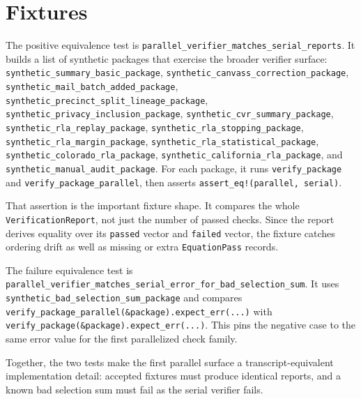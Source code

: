 \section{Fixtures}

The positive equivalence test is
\texttt{parallel\_verifier\_matches\_serial\_reports}. It builds a list of
synthetic packages that exercise the broader verifier surface:
\texttt{synthetic\_summary\_basic\_package},
\texttt{synthetic\_canvass\_correction\_package},
\texttt{synthetic\_mail\_batch\_added\_package},
\texttt{synthetic\_precinct\_split\_lineage\_package},
\texttt{synthetic\_privacy\_inclusion\_package},
\texttt{synthetic\_cvr\_summary\_package},
\texttt{synthetic\_rla\_replay\_package},
\texttt{synthetic\_rla\_stopping\_package},
\texttt{synthetic\_rla\_margin\_package},
\texttt{synthetic\_rla\_statistical\_package},
\texttt{synthetic\_colorado\_rla\_package},
\texttt{synthetic\_california\_rla\_package}, and
\texttt{synthetic\_manual\_audit\_package}. For each package, it runs
\texttt{verify\_package} and \texttt{verify\_package\_parallel}, then asserts
\texttt{assert\_eq!(parallel, serial)}.

That assertion is the important fixture shape. It compares the whole
\texttt{VerificationReport}, not just the number of passed checks. Since the
report derives equality over its \texttt{passed} vector and \texttt{failed}
vector, the fixture catches ordering drift as well as missing or extra
\texttt{EquationPass} records.

The failure equivalence test is
\texttt{parallel\_verifier\_matches\_serial\_error\_for\_bad\_selection\_sum}.
It uses \texttt{synthetic\_bad\_selection\_sum\_package} and compares
\texttt{verify\_package\_parallel(\&package).expect\_err(...)} with
\texttt{verify\_package(\&package).expect\_err(...)}. This pins the negative
case to the same error value for the first parallelized check family.

Together, the two tests make the first parallel surface a transcript-equivalent
implementation detail: accepted fixtures must produce identical reports, and a
known bad selection sum must fail as the serial verifier fails.
